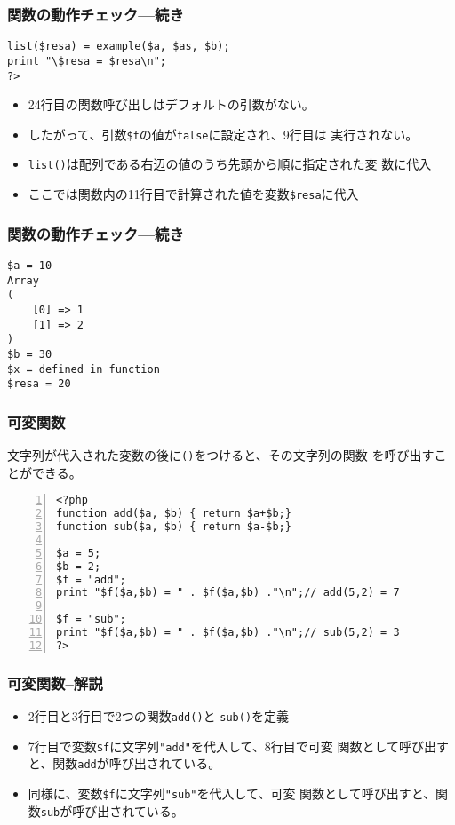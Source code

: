 \begin{frame}[containsverbatim]
\frametitle{関数の動作チェック---続き}
\begin{Verbatim}
list($resa) = example($a, $as, $b);
print "\$resa = $resa\n";
?>
\end{Verbatim}
\begin{itemize}
 \item 24行目の関数呼び出しはデフォルトの引数がない。
 \item したがって、引数\verb+$f+の値が\texttt{false}に設定され、9行目は
       実行されない。
 \item \texttt{list()}は配列である右辺の値のうち先頭から順に指定された変
       数に代入
 \item ここでは関数内の11行目で計算された値を変数\verb+$resa+に代入
\end{itemize}
\end{frame}
\begin{frame}[containsverbatim]
\frametitle{関数の動作チェック---続き}
\begin{Verbatim}
$a = 10
Array
(
    [0] => 1
    [1] => 2
)
$b = 30
$x = defined in function
$resa = 20
\end{Verbatim}
\end{frame}
 \begin{frame}[containsverbatim]
  \frametitle{可変関数}
 文字列が代入された変数の後に\texttt{()}をつけると、その文字列の関数
  を呼び出すことができる。
\begin{Verbatim}[fontsize=\small,numbers=left]
<?php
function add($a, $b) { return $a+$b;}
function sub($a, $b) { return $a-$b;}

$a = 5;
$b = 2;
$f = "add";
print "$f($a,$b) = " . $f($a,$b) ."\n";// add(5,2) = 7

$f = "sub";
print "$f($a,$b) = " . $f($a,$b) ."\n";// sub(5,2) = 3
?>
\end{Verbatim}
 \end{frame}
  \begin{frame}[containsverbatim]
  \frametitle{可変関数--解説}
\begin{itemize}
\item 2行目と3行目で2つの関数\texttt{add()}と
       \texttt{sub()}を定義
 \item 7行目で変数\Verb+$f+に文字列\Verb+"add"+を代入して、8行目で可変
       関数として呼び出すと、関数\texttt{add}が呼び出されている。
 \item 同様に、変数\Verb+$f+に文字列\Verb+"sub"+を代入して、可変
       関数として呼び出すと、関数\texttt{sub}が呼び出されている。
\end{itemize}
\end{frame}





